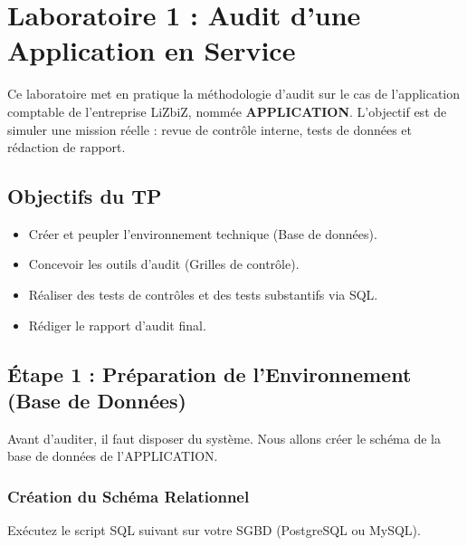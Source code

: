 
\chapter{Laboratoire 1 : Audit d'une Application en Service}\label{chap:lab1_application}

Ce laboratoire met en pratique la méthodologie d'audit sur le cas de l'application comptable de l'entreprise LiZbiZ, nommée \textbf{APPLICATION}. L'objectif est de simuler une mission réelle : revue de contrôle interne, tests de données et rédaction de rapport.

\section{Objectifs du TP}
\begin{itemize}
    \item Créer et peupler l'environnement technique (Base de données).
    \item Concevoir les outils d'audit (Grilles de contrôle).
    \item Réaliser des tests de contrôles et des tests substantifs via SQL.
    \item Rédiger le rapport d'audit final.
\end{itemize}

\section{Étape 1 : Préparation de l'Environnement (Base de Données)}

Avant d'auditer, il faut disposer du système. Nous allons créer le schéma de la base de données de l'APPLICATION.

\subsection{Création du Schéma Relationnel}

Exécutez le script SQL suivant sur votre SGBD (PostgreSQL ou MySQL).


